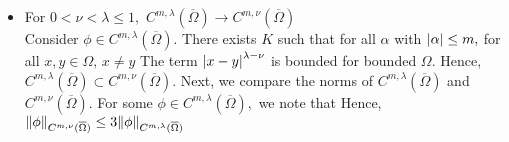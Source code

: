 \begin{itemize}
    \item For $0<\nu<\lambda\leq 1,$ $C^{m,\lambda}(\overline{\Omega})\rightarrow C^{m,\nu}(\overline{\Omega})$ \\
    Consider $\phi\in C^{m,\lambda}(\overline{\Omega}).$ There exists $K$ such that for all $\alpha$ with $\abs{\alpha}\leq m,$ for all $x,y\in\Omega,\,x\neq y$
    The term $\abs{x-y}^{\lambda-\nu}$ is bounded for bounded $\Omega.$ Hence, $C^{m,\lambda}(\overline{\Omega})\subset C^{m,\nu}(\overline{\Omega}).$ Next, we compare the norms of $C^{m,\lambda}(\overline{\Omega})$ and $C^{m,\nu}(\overline{\Omega}).$ For some $\phi\in C^{m,\lambda}(\overline{\Omega}),$ we note that
    Hence, $\norm{\phi}_{C^{m,\nu}(\overline{\Omega})} \leq 3\norm{\phi}_{C^{m,\lambda}(\overline{\Omega})}$
\end{itemize}



